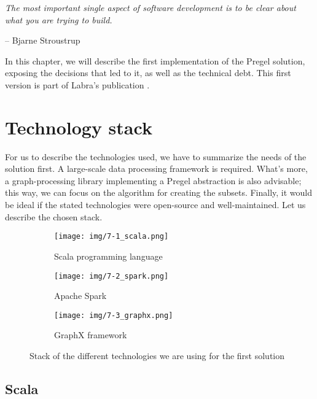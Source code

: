 \epigraph{\textit{The most important single aspect of software development is to be clear about what you are trying to build.}}{-- \textup{Bjarne Stroustrup}}

In this chapter, we will describe the first implementation of the Pregel solution, exposing the decisions that led to it, as well as the technical debt. This first version is part of Labra's publication \cite{https://doi.org/10.48550/arxiv.2110.11709}.

\section{Technology stack}

For us to describe the technologies used, we have to summarize the needs of the solution first. A large-scale data processing framework is required. What's more, a graph-processing library implementing a Pregel abstraction is also advisable; this way, we can focus on the algorithm for creating the subsets. Finally, it would be ideal if the stated technologies were open-source and well-maintained. Let us describe the chosen stack.

\begin{figure}[ht]
    \begin{subfigure}{.3\textwidth}
        \centering
        \texttt{[image: img/7-1\_scala.png]}
        \caption{Scala programming language}
    \end{subfigure}%
    \hspace*{0.5em}
    \begin{subfigure}{.3\textwidth}
        \centering
        \texttt{[image: img/7-2\_spark.png]}
        \caption{Apache Spark}
    \end{subfigure}%
    \hspace*{0.5em}
    \begin{subfigure}{.3\textwidth}
        \centering
        \texttt{[image: img/7-3\_graphx.png]}
        \caption{GraphX framework}
    \end{subfigure}%
    \caption{Stack of the different technologies we are using for the first solution}
\end{figure}

\subsection{Scala}


